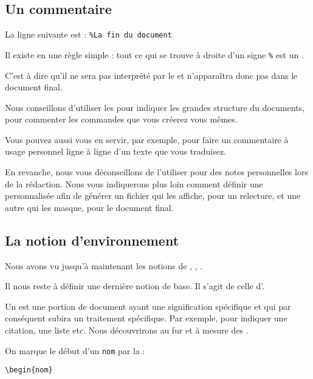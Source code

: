 \subsection{Un commentaire}

La ligne suivante est : \verb|%La fin du document|

Il existe en \logiciel{\LaTeX} une règle simple : tout ce qui se trouve à droite d'un signe \verb|%| est un .

C'est à dire qu'il ne sera pas interprété par le  et n'apparaîtra donc pas dans le document final. 

Nous conseillons d'utiliser les  pour indiquer les grandes structure du documents, pour commenter les commandes que vous créerez vous mêmes. 

Vous pouvez aussi vous en servir, par exemple, pour faire un commentaire à usage personnel ligne à ligne d'un texte que vous traduisez.

En revanche, nous vous déconseillons de l'utiliser pour des notes personnelles lors de la rédaction. Nous vous indiquerons plus loin  comment définir une  personnalisée afin de générer un fichier qui les affiche, pour un relecture, et une autre qui les masque, pour le document final.



\subsection{La notion d'environnement }

Nous avons vu jusqu'à maintenant les notions de  , , . 

Il nous reste à définir une dernière notion de base. Il s'agit de celle d'.

Un  est une portion de document ayant une signification spécifique et qui par conséquent subira un traitement spécifique. Par exemple, pour indiquer une citation, une liste etc. Nous découvrirons au fur et à mesure  des . 


On marque le début d'un  \verb|nom| par la  :

\begin{verbatim}
\begin{nom}
\end{verbatim}

